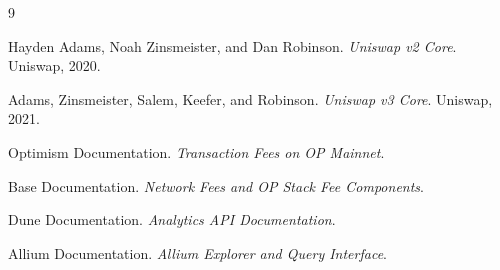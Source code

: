 \documentclass[11pt]{article}
\begin{document}
\begin{thebibliography}{9}

Hayden Adams, Noah Zinsmeister, and Dan Robinson.
\newblock \emph{Uniswap v2 Core}.
\newblock Uniswap, 2020.

Adams, Zinsmeister, Salem, Keefer, and Robinson.
\newblock \emph{Uniswap v3 Core}.
\newblock Uniswap, 2021.

Optimism Documentation.
\newblock \emph{Transaction Fees on OP Mainnet}.

Base Documentation.
\newblock \emph{Network Fees and OP Stack Fee Components}.

Dune Documentation.
\newblock \emph{Analytics API Documentation}.

Allium Documentation.
\newblock \emph{Allium Explorer and Query Interface}.

\end{thebibliography}
\end{document}
